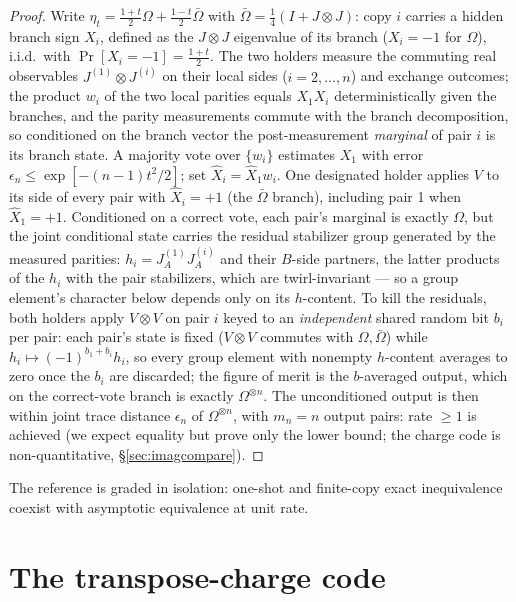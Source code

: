 \documentclass[11pt]{article}
\theoremstyle{plain}
\theoremstyle{definition}
\theoremstyle{remark}
\theoremstyle{plain}
\newcommand{\Om}{\Omega}
\begin{document}
\begin{proof}
Write $\eta_t = \tfrac{1+t}2\Om + \tfrac{1-t}2\bar\Om$ with
$\bar\Om = \tfrac14(I + J\otimes J)$: copy $i$ carries a hidden
branch sign $X_i$, defined as the $J\otimes J$ eigenvalue of its
branch ($X_i = -1$ for $\Om$), i.i.d.\ with
$\Pr[X_i = -1] = \tfrac{1+t}2$. The two
holders measure the commuting real observables
$J^{(1)}\otimes J^{(i)}$ on their local sides ($i = 2,\dots,n$)
and exchange outcomes; the product $w_i$ of the two local parities
equals $X_1X_i$ deterministically given the branches, and the
parity measurements commute with the branch decomposition, so
conditioned on the branch vector the post-measurement
\emph{marginal} of pair $i$ is its branch state. A majority vote
over $\{w_i\}$ estimates $X_1$ with error
$\epsilon_n\le\exp[-(n-1)t^2/2]$; set $\hat X_i = \hat X_1w_i$.
One designated holder applies $V$ to its side of every pair with
$\hat X_i = +1$ (the $\bar\Om$ branch), including pair 1 when
$\hat X_1 = +1$. Conditioned on a correct vote, each pair's
marginal is exactly $\Om$, but the joint conditional state carries
the residual stabilizer group generated by the measured parities:
$h_i = J^{(1)}_AJ^{(i)}_A$ and their $B$-side partners, the latter
products of the $h_i$ with the pair stabilizers, which are
twirl-invariant --- so a group element's character below depends
only on its $h$-content. To kill the residuals, both holders apply
$V\otimes V$ on pair $i$ keyed to an \emph{independent} shared
random bit $b_i$ per pair: each pair's state is fixed
($V\otimes V$ commutes with $\Om,\bar\Om$) while
$h_i\mapsto(-1)^{b_1+b_i}h_i$, so every group element with
nonempty $h$-content averages to zero once the $b_i$ are
discarded; the figure of merit is the $b$-averaged output, which
on the correct-vote branch is exactly $\Om^{\otimes n}$. The
unconditioned output is then within
joint trace distance $\epsilon_n$ of $\Om^{\otimes n}$, with
$m_n = n$ output pairs: rate $\ge1$ is achieved (we expect
equality but prove only the lower bound; the charge code is
non-quantitative, \S\ref{sec:imagcompare}).
\end{proof}

The reference is graded in isolation: one-shot and finite-copy
exact inequivalence coexist with asymptotic equivalence at unit
rate.

\section{The transpose-charge code}\label{sec:code}
\end{document}
